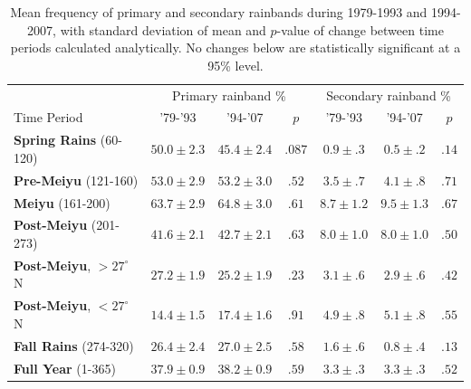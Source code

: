 \documentclass{ametsoc}
\begin{document}
\begin{table}

\centering

\caption{Mean frequency of primary and secondary rainbands during 1979-1993 and 1994-2007, with standard deviation of mean and $p$-value of change between time periods  calculated analytically. No changes below are statistically significant at a 95\% level.}

\begin{tabular}{ l c c c c c c}
	& \multicolumn{3}{c}{Primary rainband \%} & \multicolumn{3}{c}{Secondary rainband \%} \\
	Time Period & '79-'93 & '94-'07 & $p$ & '79-'93 & '94-'07 & $p$ \\
	\hline	
	\textbf{Spring Rains} (60-120)		& $50.0 \pm 2.3$ & $45.4 \pm 2.4$ & $ .087 $ 	& $0.9 \pm .3$ 	& $0.5 \pm .2$ & $.14$ \\
	\textbf{Pre-Meiyu} (121-160) 		& $53.0 \pm 2.9$ & $53.2 \pm 3.0$ & $ .52$ 	& $3.5 \pm .7$ 	& $4.1 \pm .8$ & $.71$ \\
	\textbf{Meiyu} (161-200)			& $63.7 \pm 2.9$ & $64.8 \pm 3.0$ & $ .61 $ 	& $8.7 \pm 1.2$ 	& $9.5 \pm 1.3$  & $.67$ \\
	\textbf{Post-Meiyu} (201-273)		& $41.6 \pm 2.1$ & $42.7 \pm 2.1$ & $ .63 $	& $8.0 \pm 1.0$ 	& $8.0 \pm 1.0$ & $.50$ \\
	\textbf{Post-Meiyu}, $>27^\circ$N 	& $27.2 \pm 1.9$ & $25.2 \pm 1.9$ & $ .23 $ 	& $3.1 \pm .6$ 	& $2.9 \pm .6$ & $.42$ \\
	\textbf{Post-Meiyu}, $<27^\circ$N 	& $14.4 \pm 1.5 $ & $17.4 \pm 1.6$ & $ .91 $ 	& $4.9 \pm .8$ 	& $5.1 \pm .8$ & $.55$  \\
	\textbf{Fall Rains} (274-320)			& $26.4 \pm 2.4 $ & $27.0 \pm 2.5$ & $ .58 $ 	& $1.6 \pm .6$ 	& $0.8 \pm .4$ & $.13$ \\
	\textbf{Full Year} (1-365)			& $37.9 \pm 0.9 $ & $38.2 \pm 0.9$ & $ .59 $ 	& $3.3 \pm .3$ 	& $3.3 \pm .3$ & $.52$ \\

\end{tabular}
\label{tab:t37}
\end{table}
\end{document}
